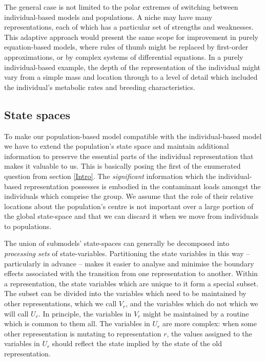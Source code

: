 The general case is not limited to the polar extremes of switching between
individual-based models and populations. A niche may have many
representations, each of which has a particular set of strengths and
weaknesses. This adaptive approach would present the same scope for
improvement in purely equation-based models, where rules of thumb might be
replaced by first-order approximations, or by complex systems of differential
equations. In a purely individual-based example, the depth of the
representation of the individual might vary from a simple mass and location
through to a level of detail which included the individual's metabolic rates
and breeding characteristics.

\subsection{State spaces}

To make our population-based model compatible with the individual-based model
we have to extend the population's state space and maintain additional
information to preserve the essential parts of the individual representation
that makes it valuable to us. This is basically posing the first of the
enumerated question from section \ref{Intro}. The {\em{significant}\/}
information which the individual-based representation possesses is embodied in
the contaminant loads amongst the individuals which comprise the group. We
assume that the role of their relative locations about the population's centre
is not important over a large portion of the global state-space and that we
can discard it when we move from individuals to populations.

The union of submodels' state-spaces can generally be decomposed into
{\em{processing sets}\/} of state-variables. Partitioning the state variables
in this way -- particularly in advance -- makes it easier to analyse and
minimise the boundary effects associated with the transition from one
representation to another. Within a representation, the state variables which
are unique to it form a special subset. The subset can be divided into the
variables which need to be maintained by other representations, which we call
$V_r^{}$, and the variables which do not which we will call $U_r^{}$. In
principle, the variables in $V_r$ might be maintained by a routine which is
common to them all. The variables in $U_r$ are more complex: when some other
representation is mutating to representation $r$, the values assigned to the
variables in $U_r$ should reflect the state implied by the state of the old
representation.

